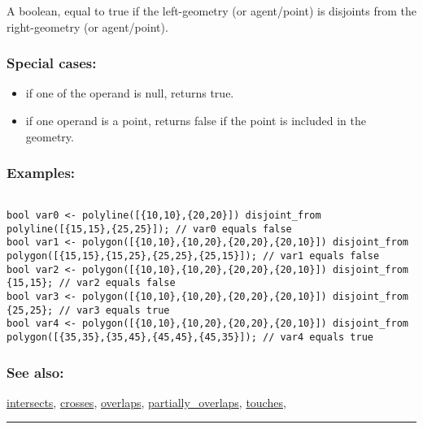 \documentclass[]{book}
\providecommand{\tightlist}{%
  \setlength{\itemsep}{0pt}\setlength{\parskip}{0pt}}
\theoremstyle{definition}
\theoremstyle{definition}
\theoremstyle{definition}
\theoremstyle{remark}
\begin{document}
A boolean, equal to true if the left-geometry (or agent/point) is
disjoints from the right-geometry (or agent/point).

\subsubsection{Special cases:}\label{special-cases-50}

\begin{itemize}
\tightlist
\item
  if one of the operand is null, returns true.\\
\item
  if one operand is a point, returns false if the point is included in
  the geometry.
\end{itemize}

\subsubsection{Examples:}\label{examples-101}

\begin{verbatim}
 
bool var0 <- polyline([{10,10},{20,20}]) disjoint_from polyline([{15,15},{25,25}]); // var0 equals false 
bool var1 <- polygon([{10,10},{10,20},{20,20},{20,10}]) disjoint_from polygon([{15,15},{15,25},{25,25},{25,15}]); // var1 equals false 
bool var2 <- polygon([{10,10},{10,20},{20,20},{20,10}]) disjoint_from {15,15}; // var2 equals false 
bool var3 <- polygon([{10,10},{10,20},{20,20},{20,10}]) disjoint_from {25,25}; // var3 equals true 
bool var4 <- polygon([{10,10},{10,20},{20,20},{20,10}]) disjoint_from polygon([{35,35},{35,45},{45,45},{45,35}]); // var4 equals true
\end{verbatim}

\subsubsection{See also:}\label{see-also-79}

\href{operators-i-to-m.html\#intersects}{intersects},
\href{operators-b-to-c.html\#crosses}{crosses},
\href{operators-n-to-r.html\#overlaps}{overlaps},
\href{operators-n-to-r.html\#partially_overlaps}{partially\_overlaps},
\href{operators-s-to-z.html\#touches}{touches},

\begin{center}\rule{0.5\linewidth}{\linethickness}\end{center}
\end{document}
